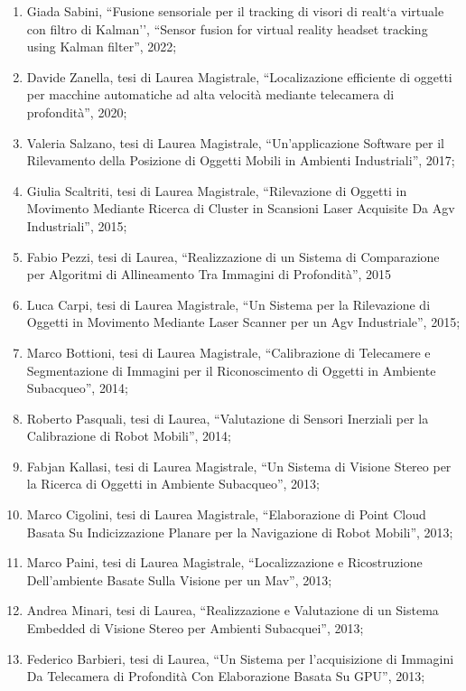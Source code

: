 \documentclass[11pt]{article}
\begin{document}
\begin{enumerate}
\item Giada Sabini, ``Fusione sensoriale per il tracking di visori di realt`a virtuale con filtro di Kalman'', 
  ``Sensor fusion for virtual reality headset tracking using Kalman filter'', 2022; 
%
\item Davide Zanella, tesi di Laurea Magistrale, ``Localizazione efficiente di oggetti per macchine automatiche ad alta velocit\`a mediante telecamera di profondit\`a'', 2020;
\item Valeria Salzano, tesi di Laurea Magistrale, ``Un'applicazione Software per il Rilevamento della Posizione di Oggetti Mobili  in Ambienti Industriali'', 2017;
%
\item Giulia Scaltriti, tesi di Laurea Magistrale, ``Rilevazione di Oggetti in Movimento Mediante Ricerca di Cluster  in Scansioni Laser Acquisite Da Agv Industriali'', 2015;
\item Fabio Pezzi, tesi di Laurea, ``Realizzazione di un Sistema di Comparazione per Algoritmi di Allineamento Tra Immagini di Profondit\`a'', 2015
\item Luca Carpi, tesi di Laurea Magistrale, ``Un Sistema per la Rilevazione di Oggetti in Movimento Mediante Laser Scanner per un Agv Industriale'', 2015;
%
\item Marco Bottioni, tesi di Laurea Magistrale, ``Calibrazione di Telecamere e Segmentazione di Immagini per il Riconoscimento di Oggetti in Ambiente Subacqueo'', 2014;
\item Roberto Pasquali, tesi di Laurea, ``Valutazione di Sensori Inerziali per la Calibrazione di Robot Mobili'', 2014;
%
\item Fabjan Kallasi,  tesi di Laurea Magistrale, ``Un Sistema di Visione Stereo per la Ricerca di Oggetti in Ambiente Subacqueo'', 2013;
\item Marco Cigolini, tesi di Laurea Magistrale, ``Elaborazione di Point Cloud Basata Su Indicizzazione Planare per la Navigazione di Robot Mobili'', 2013;
\item Marco Paini, tesi di Laurea Magistrale, ``Localizzazione e Ricostruzione Dell'ambiente Basate Sulla Visione per un Mav'', 2013;
\item Andrea Minari, tesi di Laurea, ``Realizzazione e Valutazione di un Sistema Embedded di Visione Stereo per Ambienti Subacquei'', 2013;
\item Federico Barbieri, tesi di Laurea, ``Un Sistema per l'acquisizione di Immagini Da Telecamera di Profondit\`a Con Elaborazione Basata Su GPU'', 2013;

\end{enumerate}
\end{document}
